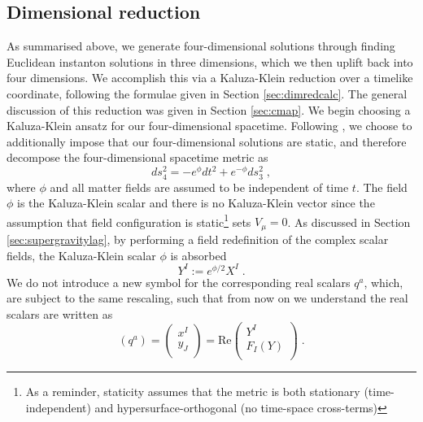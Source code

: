 \subsection{Dimensional reduction}
\label{sec:dimred}

As summarised above, we generate four-dimensional solutions through finding Euclidean instanton solutions in three dimensions, which we then uplift back into four dimensions. We accomplish this via a Kaluza-Klein reduction over a timelike coordinate, following the formulae given in Section \ref{sec:dimredcalc}. The general discussion of this reduction was given in Section \ref{sec:cmap}. We begin choosing a Kaluza-Klein ansatz for our four-dimensional spacetime. Following \cite{Dempster:2014}, we choose to additionally impose that our four-dimensional solutions are static, and therefore decompose the four-dimensional spacetime metric as
\begin{equation}
\label{eq:4d3d}
 ds_4^2 = - e^{\phi} dt^2 + e^{-\phi} ds_3^2 \; ,
\end{equation}
where $\phi$ and all matter fields are assumed to be independent of time $t$. The field $\phi$ is the Kaluza-Klein scalar and there is no Kaluza-Klein vector since the assumption that field configuration is static\footnote{As a reminder, staticity assumes that the metric is both stationary (time-independent) and hypersurface-orthogonal (no time-space cross-terms)} sets $V_\mu = 0$. As discussed in Section \ref{sec:supergravitylag}, by performing a field redefinition of the complex scalar fields, the Kaluza-Klein scalar $\phi$ is absorbed
\begin{equation}
\label{YX}
Y^I := e^{\phi/2} X^I \;.
\end{equation}
We do not introduce a new symbol for the corresponding real scalars $q^a$, which, are subject to the same rescaling, such that from now on we understand the real scalars are written as
\[
 (q^a) = \left( \begin{array}{c}
          x^I \\ y_J \\
          \end{array} \right) = \mbox{Re}
         \left( \begin{array}{c}
             Y^I \\ F_I(Y) \\
            \end{array} \right) \;.
\]
